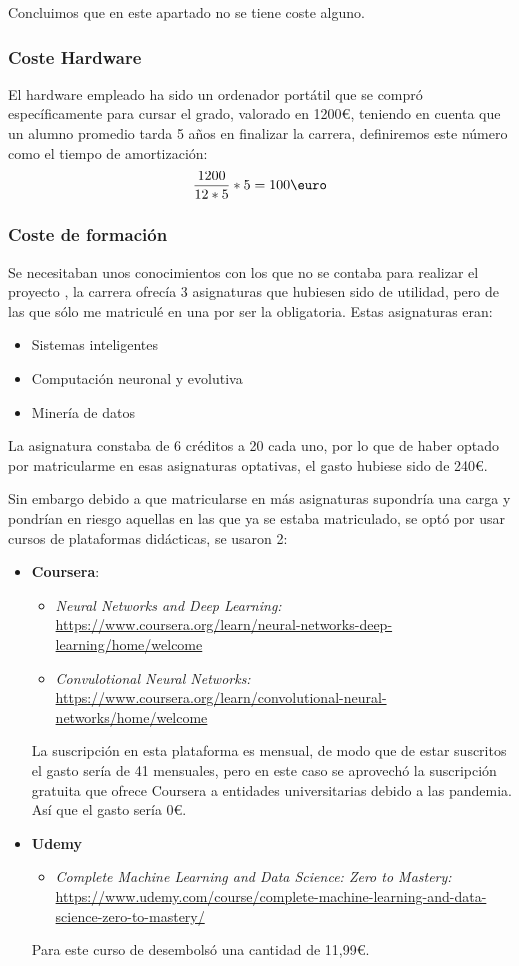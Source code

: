 Concluimos que en este apartado no se tiene coste alguno.
\subsubsection{Coste Hardware}
El hardware empleado ha sido un ordenador portátil que se compró específicamente para cursar el grado, valorado en 1200\euro, teniendo en cuenta que un alumno promedio tarda 5 años en finalizar la carrera, definiremos este número como el tiempo de amortización:
\begin{equation}
\frac{1200}{12 * 5} * 5 = 100  \text{\euro}
\end{equation}

\subsubsection{Coste de formación}
Se necesitaban unos conocimientos con los que no se contaba para realizar el proyecto , la carrera ofrecía 3 asignaturas que hubiesen sido de utilidad, pero de las que sólo me matriculé en una por ser la obligatoria. Estas asignaturas eran:
\begin{itemize}
    \item Sistemas inteligentes
    \item Computación neuronal y evolutiva
    \item Minería de datos
\end{itemize}
La asignatura constaba de 6 créditos a 20\text{\euro}  cada uno, por lo que de haber optado por matricularme en esas asignaturas optativas, el gasto hubiese sido de 240\euro.

Sin embargo debido a que matricularse en más asignaturas supondría una carga y pondrían en riesgo aquellas en las que ya se estaba matriculado, se optó por usar cursos de plataformas didácticas, se usaron 2:
\begin{itemize}
    \item \textbf{Coursera}:
    \begin{itemize}
        \item \emph{Neural Networks and Deep Learning: }\url{https://www.coursera.org/learn/neural-networks-deep-learning/home/welcome}
        \item \emph{Convulotional Neural Networks: } \url{https://www.coursera.org/learn/convolutional-neural-networks/home/welcome}
    \end{itemize}
    La suscripción en esta plataforma es mensual, de modo que de estar suscritos el gasto sería de 41\text{\euro} mensuales, pero en este caso se aprovechó la suscripción gratuita que ofrece Coursera a entidades universitarias debido a las pandemia.
    Así que el gasto sería 0\euro.
    \item\textbf{Udemy}
    \begin{itemize}
        \item \emph{Complete Machine Learning and Data Science: Zero to Mastery: }\url{https://www.udemy.com/course/complete-machine-learning-and-data-science-zero-to-mastery/}
    \end{itemize}
    Para este curso de desembolsó una cantidad de 11,99\euro.
\end{itemize}
    
